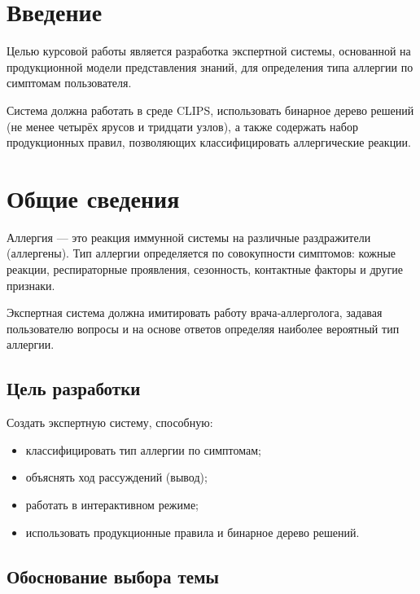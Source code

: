 \documentclass[a4paper,14pt]{extarticle}
\begin{document}
	\section*{Введение}
	
	Целью курсовой работы является разработка экспертной системы, основанной на продукционной модели представления знаний, для определения типа аллергии по симптомам пользователя.  
	
	Система должна работать в среде CLIPS, использовать бинарное дерево решений (не менее четырёх ярусов и тридцати узлов), а также содержать набор продукционных правил, позволяющих классифицировать аллергические реакции.
	
	\newpage
	
	\section{Общие сведения}
	
	Аллергия — это реакция иммунной системы на различные раздражители (аллергены). Тип аллергии определяется по совокупности симптомов: кожные реакции, респираторные проявления, сезонность, контактные факторы и другие признаки.
	
	Экспертная система должна имитировать работу врача‑аллерголога, задавая пользователю вопросы и на основе ответов определяя наиболее вероятный тип аллергии.
	
	\subsection{Цель разработки}
	
	Создать экспертную систему, способную:
	\begin{itemize}
		\item классифицировать тип аллергии по симптомам;
		\item объяснять ход рассуждений (вывод);
		\item работать в интерактивном режиме;
		\item использовать продукционные правила и бинарное дерево решений.
	\end{itemize}
	
	\subsection{Обоснование выбора темы}
	
\end{document}
